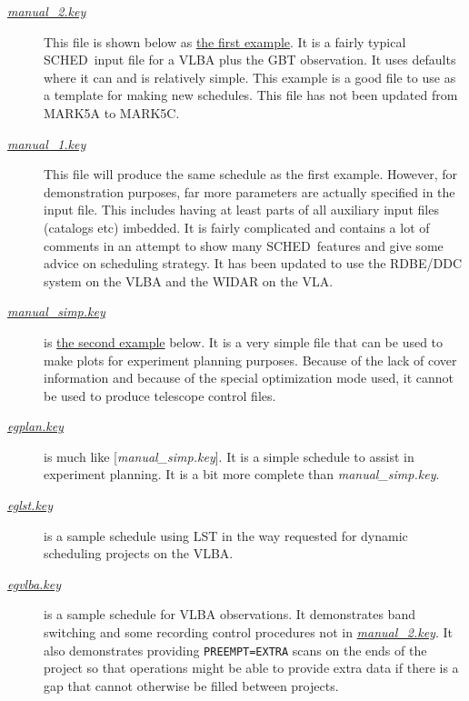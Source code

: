 \documentclass{report}
\newcommand{\schedb}{{\sc SCHED~}}
\begin{document}
\begin{description}

\item[
{\href{examples/manual\_2.key}{{\sl manual\_2.key}}}] This
file is shown below as 
{\hyperref[SSEC:EXAMPLE1]{the first example}}.  It
is a fairly typical \schedb input file for a VLBA plus the GBT
observation.  It uses defaults where it can and is relatively
simple.  This example is a good file to use as a template for making
new schedules. This file has not been updated from MARK5A to MARK5C.

\item[
{\href{examples/manual\_1.key}{{\sl manual\_1.key}}}]
This file will produce the same schedule as the
first example.  However, for demonstration purposes, far more
parameters are actually specified in the input file.  This includes
having at least parts of all auxiliary input files (catalogs etc)
imbedded.  It is fairly complicated and contains a lot of comments in
an attempt to show many \schedb features and give some advice on
scheduling strategy.  It has been updated to use the RDBE/DDC system
on the VLBA and the WIDAR on the VLA.

\item[
{\href{examples/manual\_simp.key}{{\sl manual\_simp.key}}}]
is {\hyperref[SSEC:EXAMPLE3]{the second example}} below.
It is a very simple file that can be
used to make plots for experiment planning purposes.  Because of the
lack of cover information and because of the special optimization mode
used, it cannot be used to produce telescope control files.

\item[
{\href{examples/egplan.key}{{\sl egplan.key}}}] is
much like [{\sl manual\_simp.key}].  It is a simple schedule to assist
in experiment planning.  It is a bit more complete than {\sl
manual\_simp.key}.

\item[
{\href{examples/eglst.key}{{\sl eglst.key}}}] is a
sample schedule using LST in the way requested for dynamic scheduling
projects on the VLBA.

\item[
{\href{examples/egvlba.key}{{\sl egvlba.key}}}] is a
sample schedule for VLBA observations.  It demonstrates band switching
and some recording control procedures not in 
{\href{examples/manual\_2.key}{{\sl manual\_2.key}}}.
It also demonstrates 
providing {\tt PREEMPT=EXTRA} scans on the ends of the project so
that operations might be able to provide extra data if there is a gap
that cannot otherwise be filled between projects.


\end{description}
\end{document}
